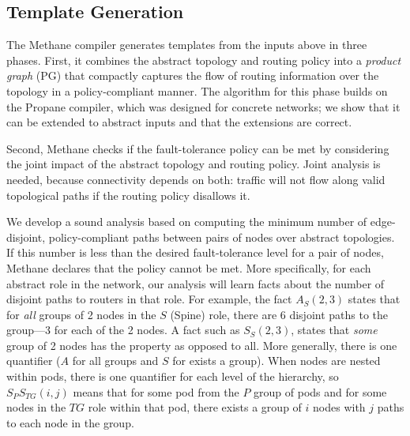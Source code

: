 \documentclass[numbers, 10pt, preprint]{sigplanconf}
\newcommand{\sysname}{{\small \sf Methane}\xspace}
\newcommand{\propane}{{\small \sf Propane}\xspace}
\begin{document}
\subsection{Template Generation}
\label{subsec:compilation}


The \sysname compiler generates templates from the inputs above in three phases. First, it combines the abstract topology and routing policy into a {\em product graph} (PG) that compactly captures the flow of routing information over the topology in a policy-compliant manner. The algorithm for this phase builds on the \propane compiler, which was designed for concrete networks; we show that it can be extended to abstract inputs and that the extensions are correct.

Second, \sysname checks if the fault-tolerance policy can be met by considering the joint impact of the abstract topology and routing policy. Joint analysis is needed, because connectivity depends on both: traffic will not flow along
valid topological paths if the routing policy disallows it.

We develop a sound analysis based on computing the minimum
number of edge-disjoint, policy-compliant paths between pairs of nodes
over abstract topologies. If this number is less
than the desired fault-tolerance level for a pair of nodes, \sysname declares that the
policy cannot be met.  More specifically,
for each abstract role in the network, our analysis will learn facts about the
number of disjoint paths to routers in that role.  For example,
the fact $A_{S}(2,3)$ states that for \emph{all} groups of 2 nodes
in the $S$ (Spine) role, there are 6 disjoint paths to the group---3
for each of the 2 nodes. A fact such as $S_{S}(2,3)$, states that
\emph{some} group of 2 nodes has the property as opposed to all.
More generally, there is one quantifier ($A$ for all groups
and $S$ for exists a group).  When nodes are nested within pods,
there is one quantifier for each level of the hierarchy, so
$S_P S_{TG} (i,j)$ means that for some pod from the $P$ group of pods
and for some nodes in the $TG$ role within that pod, there exists a
group of $i$ nodes with $j$ paths to each node in the group.
\end{document}
